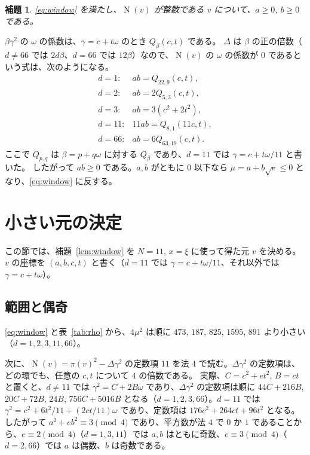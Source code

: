 \documentclass[a4paper,11pt]{ltjsarticle}
\makeatletter
\theoremstyle{jplain}
\newtheorem{lemma}[theorem]{補題}
\renewcommand{\proofname}{証明}
\renewenvironment{proof}[1][\proofname]{\par\pushQED{\qed}\normalfont\topsep6\p@\@plus6\p@\relax
  \trivlist\item[\hskip\labelsep\bfseries #1]\ignorespaces}{\popQED\endtrivlist\@endpefalse}
\numberwithin{equation}{section}
\numberwithin{table}{section}
\newcommand{\Nm}{\operatorname{N}}
\makeatother
\begin{document}
\begin{lemma}\label{lem:signs}
\eqref{eq:window} を満たし、$\Nm(v)$ が整数である $v$ について、$a\ge0$, $b\ge0$ である。
\end{lemma}

\begin{proof}
$\beta\gamma^2$ の $\omega$ の係数は、$\gamma=c+t\omega$ のとき $Q_\beta(c,t)$ である。
$\Delta$ は $\beta$ の正の倍数（$d\ne66$ では $2d\beta$、$d=66$ では $12\beta$）なので、$\Nm(v)$ の $\omega$ の係数が $0$ であるという式は、次のようになる。
\[
\begin{array}{rl}
d=1: & ab=Q_{22,9}(c,t),\\
d=2: & ab=2Q_{5,3}(c,t),\\
d=3: & ab=3(c^2+2t^2),\\
d=11: & 11ab=Q_{8,1}(11c,t),\\
d=66: & ab=6Q_{63,19}(c,t).
\end{array}
\]
ここで $Q_{p,q}$ は $\beta=p+q\omega$ に対する $Q_\beta$ であり、$d=11$ では $\gamma=c+t\omega/11$ と書いた。
したがって $ab\ge0$ である。$a,b$ がともに $0$ 以下なら $\mu=a+b\sqrt e\le0$ となり、\eqref{eq:window} に反する。
\end{proof}

\section{小さい元の決定}\label{sec:small}

この節では、補題~\ref{lem:window} を $N=11$, $x=\xi$ に使って得た元 $v$ を決める。
$v$ の座標を $(a,b,c,t)$ と書く（$d=11$ では $\gamma=c+t\omega/11$、それ以外では $\gamma=c+t\omega$）。

\subsection{範囲と偶奇}

\eqref{eq:window} と表~\ref{tab:rho} から、$4\mu^2$ は順に $473$, $187$, $825$, $1595$, $891$ より小さい（$d=1,2,3,11,66$）。

次に、$\Nm(v)=\pi(v)^2-\Delta\gamma^2$ の定数項 $11$ を法 $4$ で読む。$\Delta\gamma^2$ の定数項は、どの環でも、任意の $c,t$ について $4$ の倍数である。
実際、$C=c^2+et^2$, $B=ct$ と置くと、$d\ne11$ では $\gamma^2=C+2B\omega$ であり、$\Delta\gamma^2$ の定数項は順に $44C+216B$, $20C+72B$, $24B$, $756C+5016B$ となる（$d=1,2,3,66$）。$d=11$ では $\gamma^2=c^2+6t^2/11+(2ct/11)\omega$ であり、定数項は $176c^2+264ct+96t^2$ となる。
したがって $a^2+eb^2\equiv3\pmod4$ であり、平方数が法 $4$ で $0$ か $1$ であることから、$e\equiv2\pmod4$（$d=1,3,11$）では $a,b$ はともに奇数、$e\equiv3\pmod4$（$d=2,66$）では $a$ は偶数、$b$ は奇数である。
\end{document}
